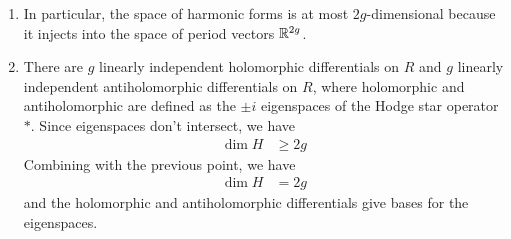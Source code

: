 \documentclass[12pt]{article}
\begin{document}
\begin{enumerate}
    \item In particular, the space of harmonic forms is at most $2g$-dimensional because it injects into the space of period vectors $\mathbb{R}^{2g}$.
    \item There are $g$ linearly independent holomorphic differentials on $R$ and $g$ linearly independent antiholomorphic differentials on $R$, where holomorphic and antiholomorphic are defined as the $\pm i$ eigenspaces of the Hodge star operator $*$. Since eigenspaces don't intersect, we have \begin{align*}
              \dim H & \geq 2g
          \end{align*} Combining with the previous point, we have \begin{align*}
              \dim H & = 2g
          \end{align*} and the holomorphic and antiholomorphic differentials give bases for the eigenspaces.
\end{enumerate}
\end{document}
